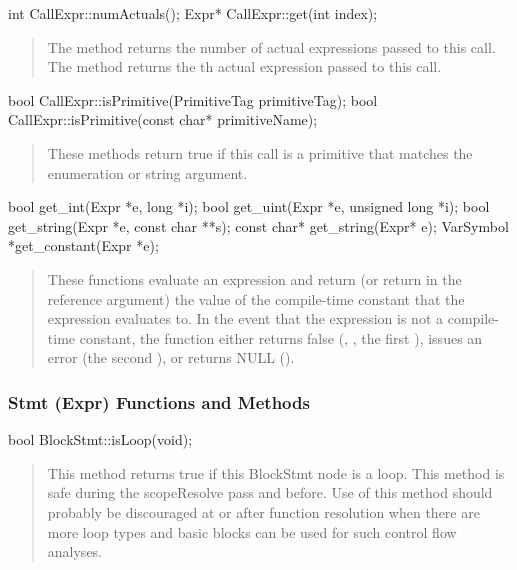 \documentclass[10pt]{article}
\begin{document}
\begin{clang}
int CallExpr::numActuals();
Expr* CallExpr::get(int index);
\end{clang}
\begin{quote}
The method  returns the number of actual expressions
passed to this call.  The method  returns the th
actual expression passed to this call.
\end{quote}

\begin{clang}
bool CallExpr::isPrimitive(PrimitiveTag primitiveTag);
bool CallExpr::isPrimitive(const char* primitiveName);
\end{clang}
\begin{quote}
These methods return true if this call is a primitive that matches the
enumeration or string argument.
\end{quote}

\begin{clang}
bool get_int(Expr *e, long *i);
bool get_uint(Expr *e, unsigned long *i);
bool get_string(Expr *e, const char **s);
const char* get_string(Expr* e);
VarSymbol *get_constant(Expr *e);
\end{clang}
\begin{quote}
These functions evaluate an expression and return (or return in the
reference argument) the value of the compile-time constant that the
expression evaluates to.  In the event that the expression is not a
compile-time constant, the function either returns false
(, , the first ), issues an
error (the second ), or returns NULL
().
\end{quote}

\subsubsection{Stmt (Expr) Functions and Methods}

\begin{clang}
bool BlockStmt::isLoop(void);
\end{clang}
\begin{quote}
This method returns true if this BlockStmt node is a loop.  This
method is safe during the scopeResolve pass and before.  Use of this
method should probably be discouraged at or after function resolution
when there are more loop types and basic blocks can be used for such
control flow analyses.
\end{quote}
\end{document}
